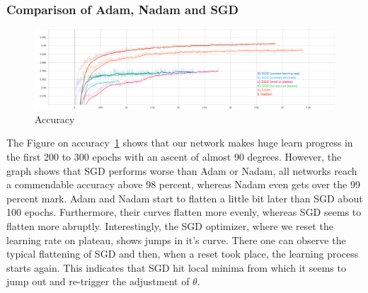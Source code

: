 
\subsubsection*{Comparison of Adam, Nadam and SGD}
\begin{figure}[H]
    \centering
    \includegraphics[width=\textwidth,height=\textheight,keepaspectratio]{img/accuracy_all.png}
    \decoRule
    \caption[Accuracy]{Accuracy}
    \label{fig:accuracy}
\end{figure}

The Figure on accuracy~\ref{fig:accuracy} shows that our network makes huge learn progress in the first
200 to 300 epochs with an ascent of almost 90 degrees.
However, the graph shows that SGD performs worse than Adam or Nadam, all networks reach a commendable accuracy above
98 percent, whereas Nadam even gets over the 99 percent mark.
Adam and Nadam start to flatten a little bit later than SGD about 100 epochs.
Furthermore, their curves flatten more evenly, whereas SGD
seems to flatten more abruptly.
Interestingly, the SGD optimizer, where we reset the learning rate on plateau, shows jumps in it's curve.
There one can observe the typical flattening of SGD and then, when a reset took place, the learning process starts again.
This indicates that SGD hit local minima from which it seems to jump out and re-trigger the adjustment of $\theta$.






